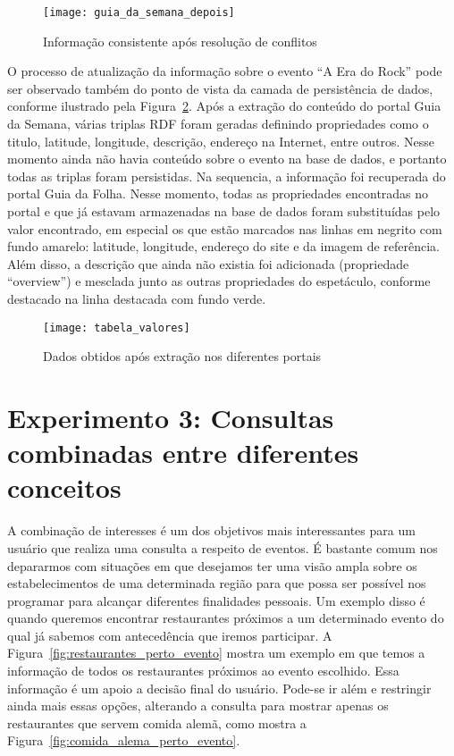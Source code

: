 \begin{figure}[!ht]
  \centering
  \texttt{[image: guia\_da\_semana\_depois]} 
  \caption{Informação consistente após resolução de conflitos}
  \label{fig:guia_da_semana_depois} 
\end{figure}

O processo de atualização da informação sobre o evento ``A Era do Rock'' pode ser observado também do ponto de vista da camada de persistência de dados, conforme ilustrado pela Figura~\ref{fig:tabela_valores}. Após a extração do conteúdo do portal Guia da Semana, várias triplas RDF foram geradas definindo propriedades como o titulo, latitude, longitude, descrição, endereço na Internet, entre outros. Nesse momento ainda não havia conteúdo sobre o evento na base de dados, e portanto todas as triplas foram persistidas. Na sequencia, a informação foi recuperada do portal Guia da Folha. Nesse momento, todas as propriedades encontradas no portal e que já estavam armazenadas na base de dados foram substituídas pelo valor encontrado, em especial os que estão marcados nas linhas em negrito com fundo amarelo: latitude, longitude, endereço do site e da imagem de referência. Além disso, a descrição que ainda não existia foi adicionada (propriedade ``overview'') e mesclada junto as outras propriedades do espetáculo, conforme destacado na linha destacada com fundo verde.

\begin{figure}[!ht]
  \centering
  \texttt{[image: tabela\_valores]} 
  \caption{Dados obtidos após extração nos diferentes portais}
  \label{fig:tabela_valores} 
\end{figure}



\section{Experimento 3: Consultas combinadas entre diferentes conceitos}
\label{sec:combinacao_consultas}

A combinação de interesses é um dos objetivos mais interessantes para um usuário que realiza uma consulta a respeito de eventos. É bastante comum nos depararmos com situações em que desejamos ter uma visão ampla sobre os estabelecimentos de uma determinada região para que possa ser possível nos programar para alcançar diferentes finalidades pessoais. Um exemplo disso é quando queremos encontrar restaurantes próximos a um determinado evento do qual já sabemos com antecedência que iremos participar. A Figura~\ref{fig:restaurantes_perto_evento} mostra um exemplo em que temos a informação de todos os restaurantes próximos ao evento escolhido. Essa informação é um apoio a decisão final do usuário. Pode-se ir além e restringir ainda mais  essas opções, alterando a consulta para mostrar apenas os restaurantes que servem comida alemã, como mostra a Figura~\ref{fig:comida_alema_perto_evento}. 

